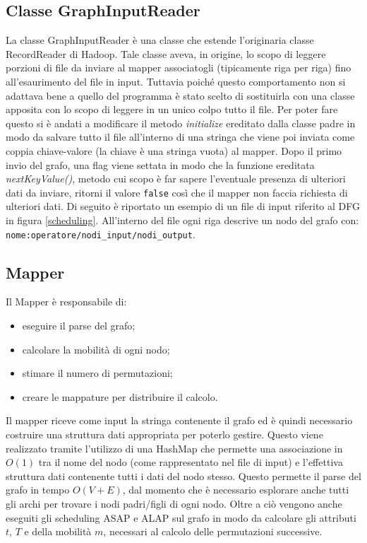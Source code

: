 \documentclass[]{IEEEtran}
\begin{document}
\subsection{Classe GraphInputReader}
La classe GraphInputReader è una classe che estende l'originaria classe RecordReader di Hadoop. Tale classe aveva, in origine, lo scopo di leggere porzioni di file da inviare al mapper associatogli (tipicamente riga per riga) fino all'esaurimento del file in input. Tuttavia poiché questo comportamento non si adattava bene a quello del programma è stato scelto di sostituirla con una classe apposita con lo scopo di leggere in un unico colpo tutto il file. Per poter fare questo si è andati a modificare il metodo \emph{initialize} ereditato dalla classe padre in modo da salvare tutto il file all'interno di una stringa che viene poi inviata come coppia chiave-valore (la chiave è una stringa vuota) al mapper. Dopo il primo invio del grafo, una flag viene settata in modo che la funzione ereditata \emph{nextKeyValue()}, metodo cui scopo è far sapere l'eventuale presenza di ulteriori dati da inviare, ritorni il valore \texttt{false} così che il mapper non faccia richiesta di ulteriori dati. Di seguito è riportato un esempio di un file di input riferito al DFG in figura \ref{scheduling}. 
All'interno del file ogni riga descrive un nodo del grafo con: \texttt{nome:operatore/nodi\_input/nodi\_output}.


\subsection{Mapper}\label{stima}
Il Mapper è responsabile di:
\begin{itemize}
	\item eseguire il parse del grafo;
	\item calcolare la mobilità di ogni nodo;
	\item stimare il numero di permutazioni;
	\item creare le mappature per distribuire il calcolo.
\end{itemize}
Il mapper riceve come input la stringa contenente il grafo ed è quindi necessario costruire una struttura dati appropriata per poterlo gestire. Questo viene realizzato tramite l'utilizzo di una HashMap che permette una associazione in $O(1)$ tra il nome del nodo (come rappresentato nel file di input) e l'effettiva struttura dati contenente tutti i dati del nodo stesso. Questo permette il parse del grafo in tempo $O(V+E)$, dal momento che è necessario esplorare anche tutti gli archi per trovare i nodi padri/figli di ogni nodo. Oltre a ciò vengono anche eseguiti gli scheduling ASAP e ALAP sul grafo in modo da calcolare gli attributi $t$, $T$ e della mobilità $m$, necessari al calcolo delle permutazioni successive.
\end{document}
